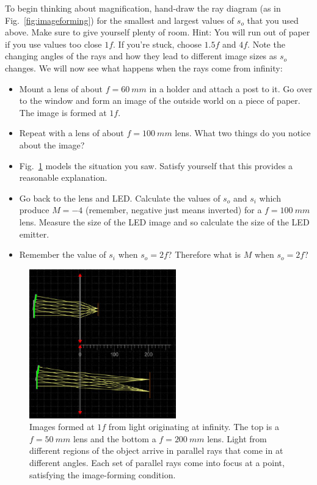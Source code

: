 \documentclass[a4paper]{report}
\begin{document}
To begin thinking about magnification, hand-draw the ray diagram (as in Fig.~\ref{fig:imageforming}) for the smallest and largest values of $s_o$ that you used above. 
Make sure to give yourself plenty of room. 
Hint: You will run out of paper if you use values too close $1f$.
If you're stuck, choose $1.5f$ and $4f$.
Note the changing angles of the rays and how they lead to different image sizes as $s_o$ changes. 
We will now see what happens when the rays come from infinity:

\begin{itemize}
\item Mount a lens of about $f=60~mm$ in a holder and attach a post to it. 
Go over to the window and form an image of the outside world on a piece of paper. 
The image is formed at $1f$.
\item Repeat with a lens of about $f=100~mm$ lens. 
What two things do you notice about the image? 
\item Fig.~\ref{fig:outside} models the situation you saw. Satisfy yourself that this provides a reasonable explanation. 
\item Go back to the lens and LED.
Calculate the values of $s_o$ and $s_i$ which produce $M=-4$ (remember, negative just means inverted) for a $f=100~mm$ lens. 
Measure the size of the LED image and so calculate the size of the LED emitter. 
\item Remember the value of $s_i$ when $s_o=2f$? Therefore what is $M$ when $s_o=2f$?
\end{itemize}


\begin{figure}[h]
\center
\includegraphics[width=2.5in]{image_forming_outside.eps}
\caption{Images formed at $1f$ from light originating at infinity. 
The top is a $f=50~mm$ lens and the bottom a $f=200~mm$ lens.
Light from different regions of the object arrive in parallel rays that come in at different angles. 
Each set of parallel rays come into focus at a point, satisfying the image-forming condition. }
\label{fig:outside}
\end{figure}
\end{document}
